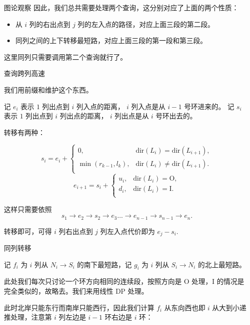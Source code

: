\documentclass{beamer}
\begin{document}
{\begin{frame}{图论观察}
因此，我们总共需要处理两个查询，这分别对应了上面的两个性质：

\begin{itemize}
  \item 从 $i$ 列的右出点到 $j$ 列的左入点的路径，对应上面三段的第二段。
  \item 同列之间的上下转移最短路，对应上面三段的第一段和第三段。
\end{itemize}

这里同列只需要调用第二个查询就行了。

\end{frame}

\begin{frame}{查询跨列高速}
  
我们用前缀和维护这个东西。

记 $e_i$ 表示 $1$ 列出点到 $i$ 列入点的距离， $i$ 列入点是从 $i - 1$ 号环进来的。
记 $s_i$ 表示 $1$ 列出点到 $i$ 列出点的距离， $i$ 列出点是从 $i$ 号环出去的。

转移有两种：

\[
  s_i = e_i +  \begin{cases}
    0, & \text{dir}(L_i) =  \text{dir}(L_{i + 1}),\\
    \min(r_{k - 1}, l_k), & \text{dir}(L_i) \ne\text{dir}(L_{i + 1}).\\
  \end{cases}
\]
\[
  e_{i + 1} = s_i +   \begin{cases}
    u_i, & \text{dir}(L_i) =  \text{O},\\
    d_i, & \text{dir}(L_i) = \text{I}.\\
  \end{cases}
\]

这样只需要依照 \[
  s_1 \rightarrow e_2 \rightarrow s_2 \rightarrow e_3 \ldots \rightarrow e_{n - 1} \rightarrow s_{n - 1} \rightarrow e_{n}.
\]

转移即可，可得 $i$ 列右出点到 $j$ 列左入点代价即为 $e_j - s_i$.

\end{frame}

\begin{frame}{同列转移}

记 $f_i$ 为 $i$ 列从 $N_i \rightarrow S_i$ 的南下最短路，记 $g_i$ 为 $i$ 列从 $S_i \rightarrow N_i$ 的北上最短路。

此处我们每次只讨论一个环方向相同的连续段，按照方向是 O 处理，I 的情况是完全类似的，故略去。我们来用线性 DP 处理。

此时北岸只能东行而南岸只能西行，因此我们计算 $f_i$ 从东向西也即 $i$ 从大到小递推处理，注意第 $i$ 列左边是 $i - 1$ 环右边是 $i$ 环：


\end{frame}}
\end{document}
